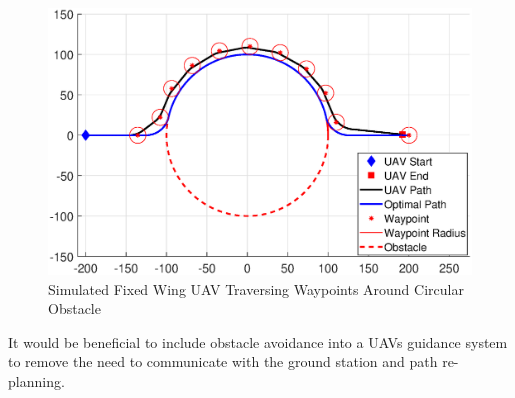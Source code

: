 \documentclass[conf]{new-aiaa}
\begin{document}
%

\begin{figure}[H]
	\centering
	\includegraphics[width=0.7\linewidth]{Figures/Simulations/pureWaypoint}
	\caption{Simulated Fixed Wing UAV Traversing Waypoints Around Circular Obstacle}
	\label{fig:purewaypoint}
\end{figure}

It would be beneficial to include obstacle avoidance into a UAVs guidance system to remove the need to communicate with the ground station and path re-planning. 

%
%
%
%
%
%
\end{document}
